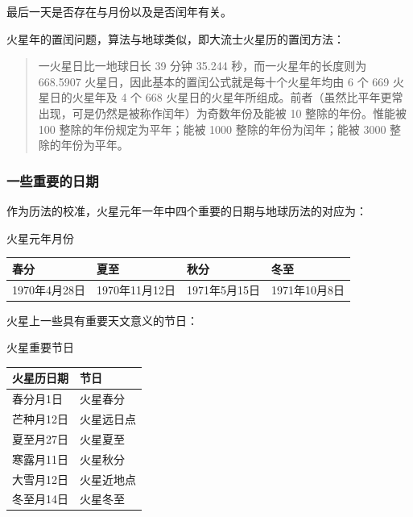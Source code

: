 \documentclass[letterpaper,10pt]{sphinxmanual}
\begin{document}
最后一天是否存在与月份以及是否闰年有关。

火星年的置闰问题，算法与地球类似，即大流士火星历的置闰方法：
\begin{quote}

一火星日比一地球日长 39 分钟 35.244 秒，而一火星年的长度则为 668.5907 火星日，因此基本的置闰公式就是每十个火星年均由 6 个 669 火星日的火星年及 4 个 668 火星日的火星年所组成。前者（虽然比平年更常出现，可是仍然是被称作闰年）为奇数年份及能被 10 整除的年份。惟能被 100 整除的年份规定为平年；能被 1000 整除的年份为闰年；能被 3000 整除的年份为平年。
\end{quote}


\subsubsection{一些重要的日期}
\label{mars:id22}
作为历法的校准，火星元年一年中四个重要的日期与地球历法的对应为：


\begin{threeparttable}
\capstart\caption{火星元年月份}

\begin{tabulary}{\linewidth}{|L|L|L|L|}
\hline
\textsf{\relax 
春分
} & \textsf{\relax 
夏至
} & \textsf{\relax 
秋分
} & \textsf{\relax 
冬至
}\\
\hline
1970年4月28日
 & 
1970年11月12日
 & 
1971年5月15日
 & 
1971年10月8日
\\
\hline\end{tabulary}

\end{threeparttable}


火星上一些具有重要天文意义的节日：


\begin{threeparttable}
\capstart\caption{火星重要节日}

\begin{tabulary}{\linewidth}{|L|L|}
\hline
\textsf{\relax 
火星历日期
} & \textsf{\relax 
节日
}\\
\hline
春分月1日
 & 
火星春分
\\

芒种月12日
 & 
火星远日点
\\

夏至月27日
 & 
火星夏至
\\

寒露月11日
 & 
火星秋分
\\

大雪月12日
 & 
火星近地点
\\

冬至月14日
 & 
火星冬至
\\
\hline\end{tabulary}

\end{threeparttable}
\end{document}
